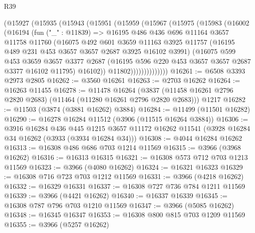 \begin{lexlean}{R39}
\begin{coremodule}
          (@15927
            (@15935
              (@15943
                (@15951
                  (@15959
                    (@15967
                      (@15975
                        (@15983
                          (@16002
                            (@16194
                              (fun ("_" : @11839) =>
                              @16195
                                @486
                                @436
                                @696
                                @11164
                                @3657
                                @11758
                                @11760
                                (@16075
                                  @492
                                  @601
                                  @3659
                                  @11163
                                  @3925
                                  @11757
                                  (@16195 @489 @231 @453 @3657 @3657 @2687 @3925 @16102 @3991)
                                  (@16075
                                    @599
                                    @453
                                    @3659
                                    @3657
                                    @3377
                                    @2687
                                    (@16195 @596 @220 @453 @3657 @3657 @2687 @3377 @16102 @11795)
                                    @16102))
                                @11802))))))))))))))
@16261 := @6508 @3393 @2973 @2805
@16262 := @3560 @16261
@16263 := @2703 @16262
@16264 := @16263 @11455
@16278 := @11478
    @16264
    (@3837 (@11458 @16261 @2796 @2820 @2683) (@11464 (@11280 @16261 @2796 @2820 @2683)))
    @1217
@16282 := @11503 (@3874 (@3881 @16262) @3884)
@16284 := @11499 (@11501 @16282)
@16290 := @16278 @16284 @11512 (@3906 (@11515 @16264 @3884))
@16306 := @3916
    @16284
    @436
    @445
    @1215
    @3657
    @11172
    @16262
    @11541
    (@3928 @16284 @34 @16262 (@3933 (@3934 @16284 @34)))
@16308 := @4044 @16284 @16262
@16313 := @16308 @486 @686 @703 @1214 @11569
@16315 := @3966 (@3968 @16262)
@16316 := @16313 @16315
@16321 := @16308 @573 @712 @703 @1213 @11569
@16323 := @3966 (@4080 @16262)
@16324 := @16321 @16323
@16329 := @16308 @716 @723 @703 @1212 @11569
@16331 := @3966 (@4218 @16262)
@16332 := @16329 @16331
@16337 := @16308 @727 @736 @784 @1211 @11569
@16339 := @3966 (@4421 @16262)
@16340 := @16337 @16339
@16345 := @16308 @787 @796 @703 @1210 @11569
@16347 := @3966 (@5085 @16262)
@16348 := @16345 @16347
@16353 := @16308 @800 @815 @703 @1209 @11569
@16355 := @3966 (@5257 @16262)

\end{coremodule}
\end{lexlean}
